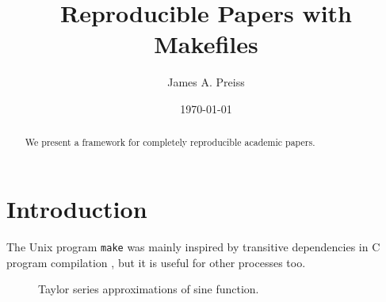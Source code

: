 \documentclass{article}
\title{Reproducible Papers with Makefiles}
\author{James A. Preiss}
\date{\today}
\begin{document}
\maketitle

\begin{abstract}
    We present a framework for completely reproducible academic papers.%
\end{abstract}

\section{Introduction}

The Unix program \texttt{make} was mainly inspired by transitive dependencies in C program compilation \citep{feldman1979make},
but it is useful for other processes too.



\begin{figure}[h]
    \centering
    
    \caption{Taylor series approximations of sine function.}
\end{figure}

\newpage



\end{document}

